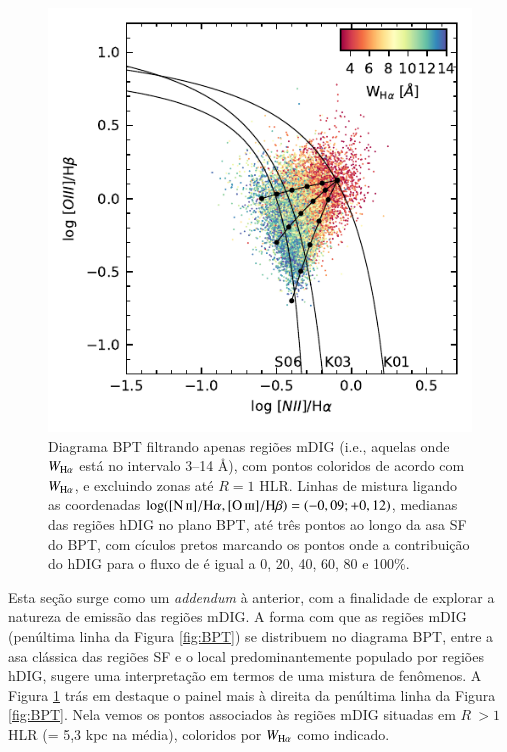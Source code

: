 \begin{figure}
 \includegraphics[scale=1.3]{figuras/fig_BPT_mixed_lines.pdf}
 \caption[Diagrama BPT -- mDIG]
 {Diagrama BPT filtrando apenas regiões mDIG (i.e., aquelas onde $W_{\Ha}$ está no intervalo 3--14 \AA), com pontos coloridos de acordo com $W_{\Ha}$, e excluindo zonas até $R = 1$ HLR. Linhas de mistura ligando as coordenadas $\log(\nii/\Ha,\oiii/\Hb) = (-0,09;+0,12)$, medianas das regiões hDIG no plano BPT, até três pontos ao longo da asa SF do BPT, com cículos pretos marcando os pontos onde a contribuição do hDIG para o fluxo de \Ha é igual a 0, 20, 40, 60, 80 e 100\%.}
 \label{fig:BPT_mDIG}
\end{figure}

Esta seção surge como um {\em addendum} à anterior, com a finalidade de explorar a natureza de emissão das regiões mDIG. A forma com que as regiões mDIG (penúltima linha da Figura \ref{fig:BPT}) se distribuem no diagrama BPT, entre a asa clássica das regiões SF e o local predominantemente populado por regiões hDIG, sugere uma interpretação em termos de uma mistura de fenômenos.
A Figura \ref{fig:BPT_mDIG} trás em destaque o painel mais à direita da penúltima linha da Figura \ref{fig:BPT}. Nela vemos os pontos associados às regiões mDIG situadas em $R\ > 1$ HLR (= 5,3 kpc na média), coloridos por $W_{\Ha}$ como indicado.


